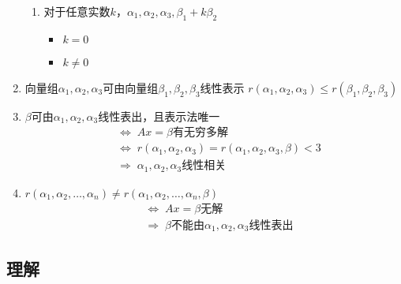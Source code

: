 \documentclass[a4paper,12pt]{article}
\begin{document}
\begin{enumerate}
\begin{enumerate}
            \item 对于任意实数$k$，$\alpha_1, \alpha_2, \alpha_3, \beta_1 + k\beta_2$
            \begin{itemize}
                \item $k = 0$ \Rightarrow {}
                \item $k \neq 0$ \Rightarrow {}
            \end{itemize}
        \end{enumerate}
        \item 向量组$\alpha_1, \alpha_2, \alpha_3$可由向量组$\beta_1, \beta_2, \beta_3$线性表示 \;\Rightarrow\; $r(\alpha_1, \alpha_2, \alpha_3) \le r(\beta_1, \beta_2, \beta_3)$
        \item $\beta$可由$\alpha_1, \alpha_2, \alpha_3$线性表出，且表示法{\color{red}{不}}唯一
        \begin{align*}
            &\Leftrightarrow\; Ax = \beta\text{有无穷多解} \\
            &\Leftrightarrow\; r(\alpha_1, \alpha_2, \alpha_3) = r(\alpha_1, \alpha_2, \alpha_3, \beta) < 3 \\
            &\Rightarrow\; \alpha_1, \alpha_2, \alpha_3\text{线性相关}
        \end{align*}
        \item $r(\alpha_1, \alpha_2, \dots, \alpha_n) \neq r(\alpha_1, \alpha_2, \dots, \alpha_n, \beta)$
        \begin{align*}
            &\Leftrightarrow\; Ax = \beta\text{无解} \\
            &\Rightarrow\; \beta\text{不能由}\alpha_1, \alpha_2, \alpha_3\text{线性表出}
        \end{align*}
    \end{enumerate}

    \subsection{理解}
\end{document}

